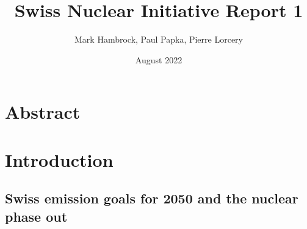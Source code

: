 \documentclass{article}
\title{Swiss Nuclear Initiative Report 1}
\author{Mark Hambrock, Paul Papka, Pierre Lorcery}
\date{August 2022}
\begin{document}
\maketitle
\section*{Abstract}
\newpage
\tableofcontents
\newpage
\section{Introduction}
\subsection{Swiss emission goals for 2050 and the nuclear phase out}
\end{document}
